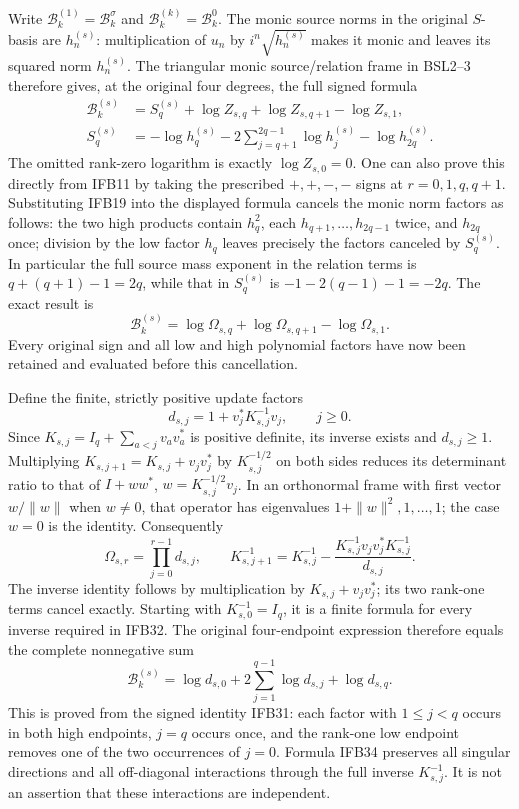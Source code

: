 \documentclass[11pt,a4paper]{article}
\begin{document}
Write $\mathcal B_k^{(1)}=\mathcal B_k^\sigma$ and
$\mathcal B_k^{(k)}=\mathcal B_k^0$. The monic source norms in the
original $S$-basis are $h_n^{(s)}$: multiplication of $u_n$ by
$i^n\sqrt{h_n^{(s)}}$ makes it monic and leaves its squared norm
$h_n^{(s)}$. The triangular monic source/relation frame in BSL2--3
therefore gives, at the original four degrees, the full signed formula
\[
 \begin{split}
 \mathcal B_k^{(s)}
 &=S_q^{(s)}+\log Z_{s,q}+\log Z_{s,q+1}-\log Z_{s,1},\\
 S_q^{(s)}
 &=-\log h_q^{(s)}-2\sum_{j=q+1}^{2q-1}\log h_j^{(s)}
                                      -\log h_{2q}^{(s)}.
 \end{split}
 \tag{IFB30}
\]
The omitted rank-zero logarithm is exactly $\log Z_{s,0}=0$.
One can also prove this directly from IFB11 by taking the prescribed
$+,+,-,-$ signs at $r=0,1,q,q+1$. Substituting IFB19 into the
displayed formula cancels the monic norm factors as follows:
the two high products contain $h_q^2$, each
$h_{q+1},\ldots,h_{2q-1}$ twice, and $h_{2q}$ once; division by
the low factor $h_q$ leaves precisely the factors canceled by
$S_q^{(s)}$. In particular the full source mass exponent in the
relation terms is $q+(q+1)-1=2q$, while that in $S_q^{(s)}$ is
$-1-2(q-1)-1=-2q$. The exact result is
\[
 \boxed{\mathcal B_k^{(s)}
    =\log\Omega_{s,q}+\log\Omega_{s,q+1}-\log\Omega_{s,1}.}
 \tag{IFB31}
\]
Every original sign and all low and high polynomial factors have
now been retained and evaluated before this cancellation.

Define the finite, strictly positive update factors
\[
 d_{s,j}=1+v_j^*K_{s,j}^{-1}v_j,\qquad j\geq0.
 \tag{IFB32}
\]
Since $K_{s,j}=I_q+\sum_{a<j}v_av_a^*$ is positive definite, its
inverse exists and $d_{s,j}\geq1$. Multiplying
$K_{s,j+1}=K_{s,j}+v_jv_j^*$ by $K_{s,j}^{-1/2}$ on both sides
reduces its determinant ratio to that of $I+ww^*$,
$w=K_{s,j}^{-1/2}v_j$. In an orthonormal frame with first vector
$w/\|w\|$ when $w\ne0$, that operator has eigenvalues
$1+\|w\|^2,1,\ldots,1$; the case $w=0$ is the identity.
Consequently
\[
 \Omega_{s,r}=\prod_{j=0}^{r-1}d_{s,j},\qquad
 K_{s,j+1}^{-1}=K_{s,j}^{-1}
 -\frac{K_{s,j}^{-1}v_jv_j^*K_{s,j}^{-1}}{d_{s,j}}.
 \tag{IFB33}
\]
The inverse identity follows by multiplication by
$K_{s,j}+v_jv_j^*$; its two rank-one terms cancel exactly.
Starting with $K_{s,0}^{-1}=I_q$, it is a finite formula for every
inverse required in IFB32. The original four-endpoint expression
therefore equals the complete nonnegative sum
\[
 \boxed{\displaystyle
 \mathcal B_k^{(s)}
 =\log d_{s,0}+2\sum_{j=1}^{q-1}\log d_{s,j}+\log d_{s,q}.}
 \tag{IFB34}
\]
This is proved from the signed identity IFB31: each factor with
$1\leq j<q$ occurs in both high endpoints, $j=q$ occurs once,
and the rank-one low endpoint removes one of the two occurrences
of $j=0$. Formula IFB34 preserves all singular directions and all
off-diagonal interactions through the full inverse $K_{s,j}^{-1}$.
It is not an assertion that these interactions are independent.
\end{document}
